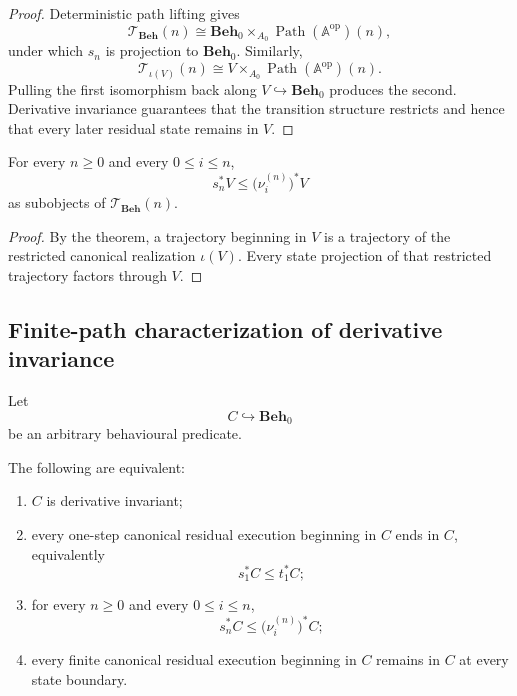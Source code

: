 \begin{proof}
Deterministic path lifting gives
\[
    \mathscr T_{\mathbf{Beh}}(n)
    \cong
    \mathbf{Beh}_0
    \times_{A_0}
    \operatorname{Path}(\mathbb A^{\mathrm{op}})(n),
\]
under which \(s_n\) is projection to \(\mathbf{Beh}_0\). Similarly,
\[
    \mathscr T_{\iota(V)}(n)
    \cong
    V\times_{A_0}
    \operatorname{Path}(\mathbb A^{\mathrm{op}})(n).
\]
Pulling the first isomorphism back along
\(V\hookrightarrow\mathbf{Beh}_0\) produces the second. Derivative
invariance guarantees that the transition structure restricts and hence that
every later residual state remains in \(V\).
\end{proof}

\begin{corollary}
\label{cor:all-vertices-remain-contract}
For every \(n\geq0\) and every \(0\leq i\leq n\),
\[
    s_n^\ast V
    \leq
    \bigl(\nu_i^{(n)}\bigr)^\ast V
\]
as subobjects of \(\mathscr T_{\mathbf{Beh}}(n)\).
\end{corollary}

\begin{proof}
By the theorem, a trajectory beginning in \(V\) is a trajectory of the
restricted canonical realization \(\iota(V)\). Every state projection of
that restricted trajectory factors through \(V\).
\end{proof}

\subsection{Finite-path characterization of derivative invariance}
\label{subsec:temporal-characterization-derivative-invariance}

Let
\[
    C\hookrightarrow\mathbf{Beh}_0
\]
be an arbitrary behavioural predicate.

\begin{theorem}
\label{thm:finite-horizon-characterization-contracts}
The following are equivalent:
\begin{enumerate}
    \item \(C\) is derivative invariant;
    \item every one-step canonical residual execution beginning in \(C\)
    ends in \(C\), equivalently
    \[
        s_1^\ast C\leq t_1^\ast C;
    \]
    \item for every \(n\geq0\) and every \(0\leq i\leq n\),
    \[
        s_n^\ast C
        \leq
        \bigl(\nu_i^{(n)}\bigr)^\ast C;
    \]
    \item every finite canonical residual execution beginning in \(C\)
    remains in \(C\) at every state boundary.
\end{enumerate}
\end{theorem}

